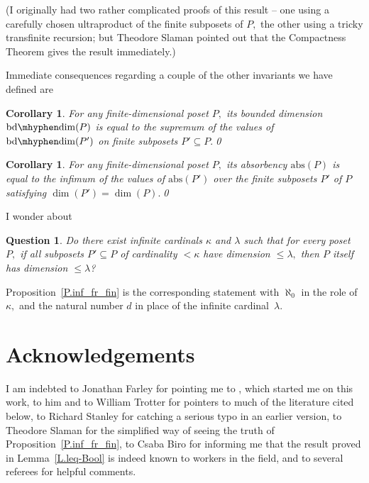 \documentclass{amsart}
\newtheorem{corollary}[theorem]{Corollary}
\newtheorem{question}[theorem]{Question}
\numberwithin{equation}{section}
\numberwithin{theorem}{section}
\renewcommand{\r}{\mathrm}
\newcommand{\2}{\mathbf{2}}
\begin{document}
(I originally had two rather complicated
proofs of this result -- one using a carefully chosen
ultraproduct of the finite subposets of $P,$ the other using
a tricky transfinite recursion;
but Theodore Slaman pointed out that the Compactness Theorem
gives the result immediately.)

Immediate consequences regarding a couple of the other invariants
we have defined are

\begin{corollary}\label{C.bddim_fr_fin}
For any finite-dimensional poset $P,$ its
bounded dimension $\r{bd\mhyphen dim}(P)$
is equal to the supremum of the values of
$\r{bd\mhyphen dim}(P')$ on finite subposets $P'\subseteq P.$\qed
\end{corollary}

\begin{corollary}\label{C.abs_fr_fin}
For any finite-dimensional poset $P,$ its absorbency
$\r{abs}(P)$ is equal to the {\em infimum} of the values of
$\r{abs}(P')$ over the finite subposets $P'$ of $P$
satisfying $\dim(P')=\dim(P).$\qed
\end{corollary}

I wonder about
%
\begin{question}\label{Q.big_fr_smaller}
Do there exist {\em infinite} cardinals $\kappa$ and $\lambda$ such
that for every poset $P,$
if all subposets $P'\subseteq P$ of cardinality $<\kappa$ have
dimension $\leq\lambda,$ then $P$ itself has dimension $\leq\lambda$?
\end{question}

Proposition~\ref{P.inf_fr_fin} is the corresponding statement
with $\aleph_0$ in the role of $\kappa,$ and the natural number
$d$ in place of the infinite cardinal~$\lambda.$

\section{Acknowledgements}\label{S.ackn}

I am indebted to Jonathan Farley for pointing me to
\cite{S3x2x2}, which started me on this work,
to him and to William Trotter for pointers
to much of the literature cited below, to Richard Stanley
for catching a serious typo in an earlier version,
to Theodore Slaman for the simplified way of seeing
the truth of Proposition~\ref{P.inf_fr_fin}, to Csaba Biro
for informing me that the result proved in Lemma~\ref{L.leq-Bool}
is indeed known to workers in the field, and to several referees
for helpful comments.
\end{document}
